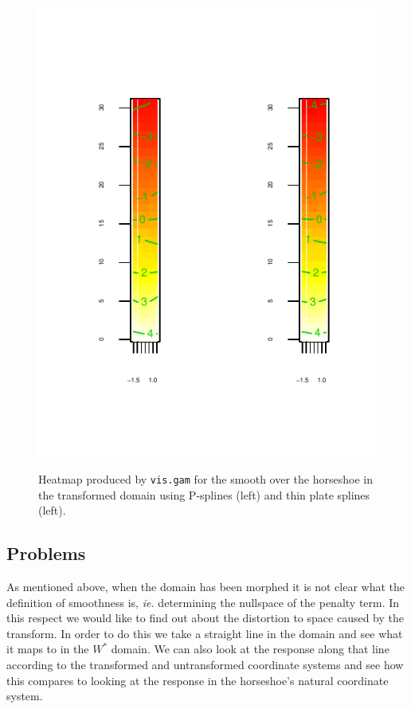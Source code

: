 \documentclass[a4paper,10pt]{amsart}
\begin{document}
\begin{figure}
\centering
\includegraphics[trim=0in 0.5in 0in 0in]{figs/hsvisgam.pdf} \\
\caption{Heatmap produced by \texttt{vis.gam} for the smooth over the horseshoe in the transformed domain using P-splines (left) and thin plate splines (left).}
\label{hsvisgam}
\end{figure}

\subsection{Problems}

As mentioned above, when the domain has been morphed it is not clear what the definition of smoothness is, \emph{ie.} determining the nullspace of the penalty term. In this respect we would like to find out about the distortion to space caused by the transform. In order to do this we take a straight line in the domain and see what it maps to in the $W^*$ domain. We can also look at the response along that line according to the transformed and untransformed coordinate systems and see how this compares to looking at the response in the horseshoe's natural coordinate system.
\end{document}

